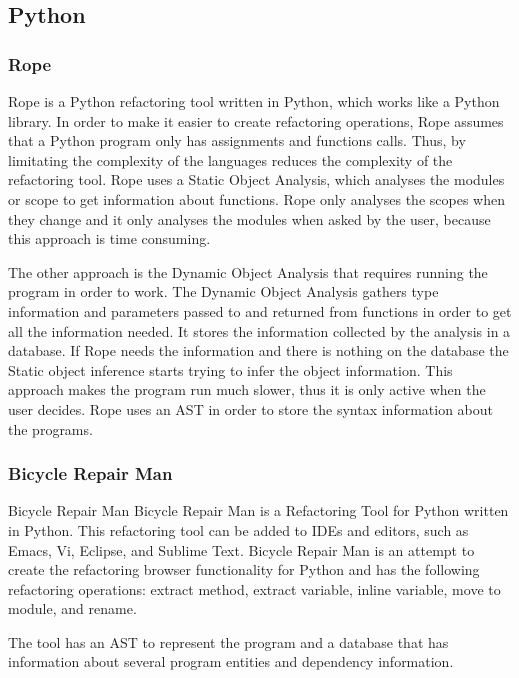 \subsection{Python}
  \subsubsection{Rope}
  Rope is a Python refactoring tool written in Python, which works like a Python library.
  In order to make it easier to create refactoring operations, Rope assumes that a
  Python program only has assignments and functions calls. %
  Thus, by limitating the complexity of the languages reduces the complexity of the
  refactoring tool.
  Rope uses a Static Object Analysis, which analyses the modules or scope to get
  information about functions.
  Rope only analyses the scopes when they change and it only analyses the modules
  when asked by the user, because this approach is time consuming.

  The other approach is the Dynamic Object Analysis that requires running
  the program in order to work.
  The Dynamic Object Analysis gathers type information and parameters passed to and returned from
  functions in order to get all the information needed.
  It stores the information collected by the analysis in a database.
  If Rope needs the information and there is nothing on the database the Static
  object inference starts trying to infer the object information.
  This approach makes the program run much slower, thus it is only active when
  the user decides.%
  Rope uses an AST in order to store the syntax information about the programs.

  \subsubsection{Bicycle Repair Man}
  Bicycle Repair Man
  Bicycle Repair Man is a Refactoring Tool for Python written in Python.
   This refactoring tool can be added to IDEs and editors, such as Emacs, Vi, Eclipse,
    and Sublime Text.
  Bicycle Repair Man is an attempt to create the refactoring browser functionality for
   Python and has the following refactoring operations:
   extract method, extract variable, inline variable, move to module, and rename.

  The tool has an AST to represent the program and a database that has information
  about several program entities and dependency information.

